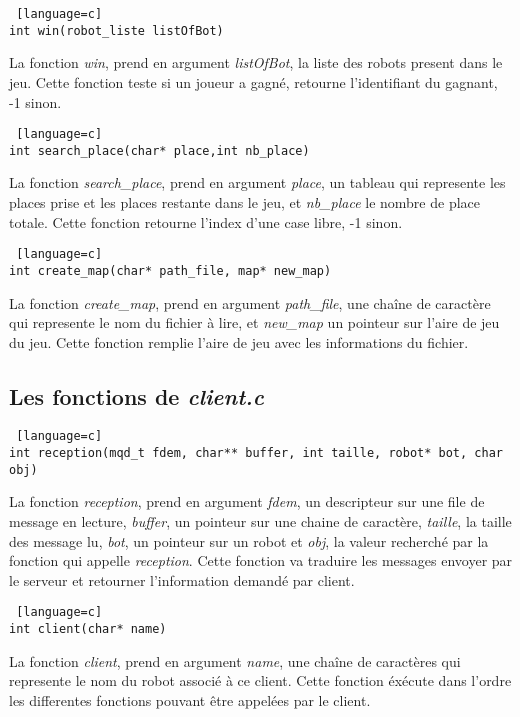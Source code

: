 \documentclass[a4paper, 11pt]{article}
\begin{document}
\begin {lstlisting} [language=c]
int win(robot_liste listOfBot)
\end{lstlisting}
La fonction \emph{win}, prend en argument \emph{listOfBot}, la liste des robots present dans le jeu. Cette fonction teste si un joueur a gagné, retourne l'identifiant du gagnant, -1 sinon.\\

\begin {lstlisting} [language=c]
int search_place(char* place,int nb_place)
\end{lstlisting}
La fonction \emph{search\_place}, prend en argument \emph{place}, un tableau qui represente les places prise et les places restante dans le jeu, et \emph{nb\_place} le nombre de place totale. Cette fonction retourne l'index d'une case libre, -1 sinon.\\

\begin {lstlisting} [language=c]
int create_map(char* path_file, map* new_map)
\end{lstlisting}
La fonction \emph{create\_map}, prend en argument \emph{path\_file}, une chaîne de caractère qui represente le nom du fichier à lire, et \emph{new\_map} un pointeur sur l'aire de jeu du jeu. Cette fonction remplie l'aire de jeu avec les informations du fichier.\\

\subsection{Les fonctions de \emph{client.c}}
\begin {lstlisting} [language=c]
int reception(mqd_t fdem, char** buffer, int taille, robot* bot, char obj)
\end{lstlisting}
La fonction \emph{reception}, prend en argument \emph{fdem}, un descripteur sur une file de message en lecture, \emph{buffer}, un pointeur sur une chaine de caractère, \emph{taille}, la taille des message lu, \emph{bot}, un pointeur sur un robot et \emph{obj}, la valeur recherché par la fonction qui appelle \emph{reception}. Cette fonction va traduire les messages envoyer par le serveur et retourner l'information demandé par client.\\

\begin {lstlisting} [language=c]
int client(char* name)
\end{lstlisting}
La fonction \emph{client}, prend en argument \emph{name}, une chaîne de caractères qui represente le nom du robot associé à ce client. Cette fonction éxécute dans l'ordre les differentes fonctions pouvant être appelées par le client.\\
\end{document}

